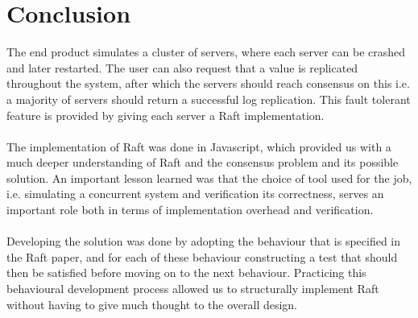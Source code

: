 \section{Conclusion} %
\label{sec:conclusion}
The end product simulates a cluster of servers, where each server can be crashed and later restarted. The user can also request that a value is replicated throughout the system, after which the servers should reach consensus on this i.e. a majority of servers should return a successful log replication. This fault tolerant feature is provided by giving each server a Raft implementation.\\ \\
The implementation of Raft was done in Javascript, which provided us with a much deeper understanding of Raft and the consensus problem and its possible solution. An important lesson learned was that the choice of tool used for the job, i.e. simulating a concurrent system and verification its correctness, serves an important role both in terms of implementation overhead and verification.\\ \\
Developing the solution was done by adopting the behaviour that is specified in the Raft paper, and for each of these behaviour constructing a test that should then be satisfied before moving on to the next behaviour. Practicing this behavioural development process allowed us to structurally implement Raft without having to give much thought to the overall design.
